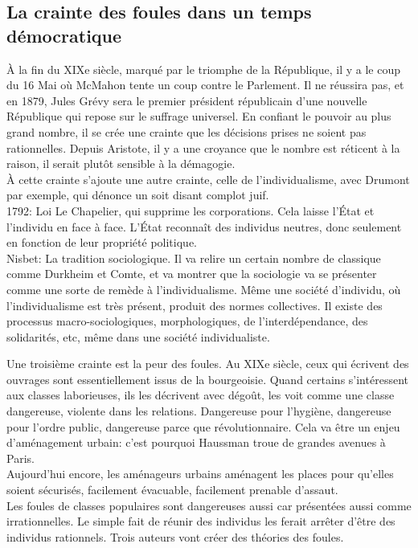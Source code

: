 \documentclass[10pt, a4paper, openany]{book}
\begin{document}
\subsection{La crainte des foules dans un temps démocratique}

À la fin du XIXe siècle, marqué par le triomphe de la République, il y a le coup du 16 Mai où McMahon tente un coup contre le Parlement. Il ne réussira pas, et en 1879, Jules Grévy sera le premier président républicain d'une nouvelle République qui repose sur le suffrage universel. En confiant le pouvoir au plus grand nombre, il se crée une crainte que les décisions prises ne soient pas rationnelles. Depuis Aristote, il y a une croyance que le nombre est réticent à la raison, il serait plutôt sensible à la démagogie. \\
À cette crainte s'ajoute une autre crainte, celle de l'individualisme, avec Drumont par exemple, qui dénonce un soit disant complot juif. \\
1792: Loi Le Chapelier, qui supprime les corporations. Cela laisse l'État et l'individu en face à face. L'État reconnaît des individus neutres, donc seulement en fonction de leur propriété politique. \\
Nisbet: La tradition sociologique. Il va relire un certain nombre de classique comme Durkheim et Comte, et va montrer que la sociologie va se présenter comme une sorte de remède à l'individualisme. Même une société d'individu, où l'individualisme est très présent, produit des normes collectives. Il existe des processus macro-sociologiques, morphologiques, de l'interdépendance, des solidarités, etc, même dans une société individualiste. 


Une troisième crainte est la peur des foules. Au XIXe siècle, ceux qui écrivent des ouvrages sont essentiellement issus de la bourgeoisie. Quand certains s'intéressent aux classes laborieuses, ils les décrivent avec dégoût, les voit comme une classe dangereuse, violente dans les relations. Dangereuse pour l'hygiène, dangereuse pour l'ordre public, dangereuse parce que révolutionnaire. Cela va être un enjeu d'aménagement urbain: c'est pourquoi Haussman troue de grandes avenues à Paris. \\
Aujourd'hui encore, les aménageurs urbains aménagent les places pour qu'elles soient sécurisés, facilement évacuable, facilement prenable d'assaut. \\
Les foules de classes populaires sont dangereuses aussi car présentées aussi comme irrationnelles. Le simple fait de réunir des individus les ferait arrêter d'être des individus rationnels. Trois auteurs vont créer des théories des foules. 
\end{document}
